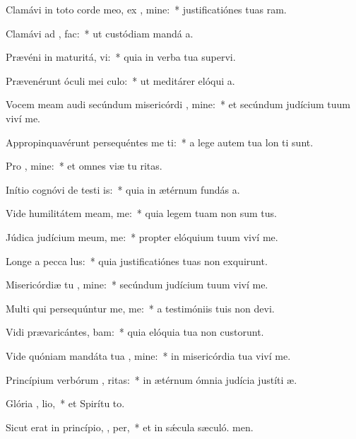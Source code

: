 \item Clamávi in toto corde meo, ex , mine:~* justificatiónes tuas ram.
\item Clamávi ad ,   fac:~* ut custódiam mandá a.
\item Prævéni in maturitá,  vi:~* quia in verba tua supervi.
\item Prævenérunt óculi mei   culo:~* ut meditárer elóqui a.
\item Vocem meam audi secúndum misericórdi , mine:~* et secúndum judícium tuum viví me.
\item Appropinquavérunt persequéntes me ti:~* a lege autem tua lon ti sunt.
\item Pro  , mine:~* et omnes viæ tu ritas.
\item Inítio cognóvi de testi is:~* quia in ætérnum fundás a.
\item Vide humilitátem meam,   me:~* quia legem tuam non sum tus.
\item Júdica judícium meum,   me:~* propter elóquium tuum viví me.
\item Longe a pecca lus:~* quia justificatiónes tuas non exquirunt.
\item Misericórdiæ tu , mine:~* secúndum judícium tuum viví me.
\item Multi qui persequúntur me,   me:~* a testimóniis tuis non devi.
\item Vidi prævaricántes,  bam:~* quia elóquia tua non custorunt.
\item Vide quóniam mandáta tua , mine:~* in misericórdia tua viví me.
\item Princípium verbórum , ritas:~* in ætérnum ómnia judícia justíti æ.
\item Glória ,  lio,~* et Spirítu to.
\item Sicut erat in princípio,  ,  per,~* et in sǽcula sæculó. men.
